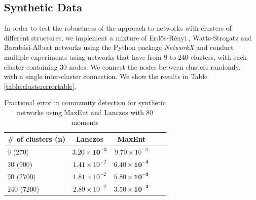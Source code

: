 \documentclass[letterpaper]{article} %
\begin{document}
\subsection{Synthetic Data}
In order to test the robustness of the approach to networks with clusters of different structures, we implement a mixture of Erd{\"o}s-R{\'e}nyi , Watts-Strogatz and Barabási-Albert networks using the Python package \textit{NetworkX} and conduct multiple experiments using networks that have from $9$ to $240$ clusters, with each cluster containing $30$ nodes. We connect the nodes between clusters randomly, with a single inter-cluster connection. We show the results in Table \ref{table:clustererrortable}.






\begin{table}[t]
	\label{table:clustererrortable}
	\caption{Fractional error in community detection for synthetic networks using MaxEnt and Lanczos with 80 moments}\label{table:fractional_error_syn}
	\begin{center}
		\begin{small}
			\begin{sc}
				\begin{tabular}{lcccr}
					\toprule
					\# of clusters (n) & Lanczos  & MaxEnt \\
					\midrule
					9 (270)    & $ \mathbf{3.20 \times 10^{-3}}$   & $9.70 \times 10^{-3}$  \\
					30 (900) & $ 1.41\times 10^{-2}$   & $ \mathbf{6.40 \times 10^{-3}}$ \\
					90 (2700) & $1.81\times 10^{-2}$   & $\mathbf{5.80\times 10^{-3}}$   \\
					240 (7200) & $2.89\times 10^{-2}$   & $\mathbf{3.50\times 10^{-3}}$   \\
					\bottomrule
				\end{tabular}
			\end{sc}
		\end{small}
	\end{center}
	\vskip -0.1in
\end{table}

\end{document}
